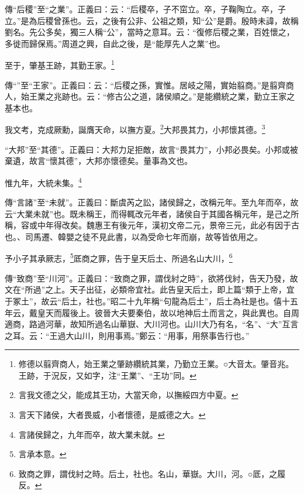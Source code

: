 {\noindent\zhuan{}\fzbyks 傳“后稷”至“之業”。正義曰：云：“后稷卒，子不窋立。卒，子鞠陶立。卒，子立。”是為后稷曾孫也。云，之後有公非、公祖之類，知“公”是爵。殷時未諱，故稱劉名。先公多矣，獨三人稱“公”，當時之意耳。云：“復修后稷之業，百姓懷之，多徙而歸保焉。”周道之興，自此之後，是“能厚先人之業”也。 \par}

至于，肇基王跡，其勤王家。\footnote{修德以翦齊商人，始王業之肇跡纘統其業，乃勤立王業。○大音太。肇音兆。王跡，于況反，又如字，注“王業”、“王功”同。}

{\noindent\shu{}\fzkt 傳“”至“王家”。正義曰：云：“后稷之孫，實惟。居岐之陽，實始翦商。”是翦齊商人，始王業之兆跡也。云：“修古公之道，諸侯順之。”是能纘統之業，勤立王家之基本也。 \par}

我文考，克成厥勳，誕膺天命，以撫方夏。\footnote{言我文德之父，能成其王功，大當天命，以撫綏四方中夏。}大邦畏其力，小邦懷其德。\footnote{言天下諸侯，大者畏威，小者懷德，是威德之大。}

{\noindent\shu{}\fzkt “大邦”至“其德”。正義曰：大邦力足拒敵，故言“畏其力”，小邦必畏矣。小邦或被棄遺，故言“懷其德”，大邦亦懷德矣。量事為文也。 \par}

惟九年，大統未集。\footnote{言諸侯歸之，九年而卒，故大業未就。}

{\noindent\zhuan{}\fzbyks 傳“言諸”至“未就”。正義曰：斷虞芮之訟，諸侯歸之，改稱元年。至九年而卒，故云“大業未就”也。既未稱王，而得輒改元年者，諸侯自于其國各稱元年，是己之所稱，容或中年得改矣。魏惠王有後元年，漢初文帝二元，景帝三元，此必有因于古也。、司馬遷、韓嬰之徒不見此書，以為受命七年而崩，故等皆依用之。 \par}

予小子其承厥志，\footnote{言承本意。}厎商之罪，告于皇天后土、所過名山大川，\footnote{致商之罪，謂伐紂之時。后土，社也。名山，華嶽。大川，河。○厎，之履反。}

{\noindent\zhuan{}\fzbyks 傳“致商”至“川河”。正義曰：“致商之罪，謂伐紂之時”，欲將伐紂，告天乃發，故文在“所過”之上。天子出征，必類帝宜社。此告皇天后土，即上篇“類于上帝，宜于冢土”，故云“后土，社也。”昭二十九年稱“句龍為后土”，后土為社是也。僖十五年云，戴皇天而履後上。彼晉大夫要秦伯，故以地神后土而言之，與此異也。自周適商，路過河華，故知所過名山華嶽、大川河也。山川大乃有名，“名”、“大”互言之耳。云：“王過大山川，則用事焉。”鄭云：“用事，用祭事告行也。” \par}

